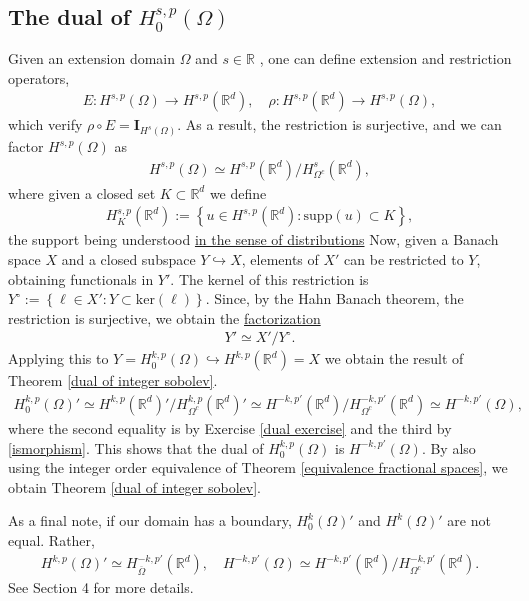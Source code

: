 \documentclass[
    a4paper,
    DIV=14,
    abstract=true,
    numbers=noenddot
]
{scrartcl}
\theoremstyle{definition}
\newcommand{\set}[1]{\left\{#1\right\}}
\newcommand{\Id}{\bm{I}}\renewcommand{\ker}{\bm{ker}}\newcommand{\supp}[1]{\bm{supp}(#1)}\renewcommand{\tr}[1]{\mathrm{tr}\left(#1\right)}
\newcommand{\rm}[1]{\mathrm{#1}}
\newcommand{\R}{\mathbb{R}}
\begin{document}
\subsection{The dual of $H^{s,p}_0(\Omega)$}
Given an extension domain $\Omega $ and $s \in \R$ , one can define extension and restriction operators,
\begin{align*}
    E:H^{s,p}(\Omega ) \to H^{s,p}(\R^d), \quad \rho: H^{s,p}(\R^d) \to H^{s,p}(\Omega ),
\end{align*}
which verify $\rho \circ E = \Id_{H^s(\Omega )}$. As a result, the restriction is surjective, and we can factor $H^{s,p}(\Omega )$ as
\begin{align}\label{ismorphism}
    H^{s,p}(\Omega )\simeq H^{s,p}(\R^d)\slash H^s_{\Omega^c}(\R^d ),
\end{align}
where given a closed set $K \subset \R^d$ we define
\begin{align*}
    H^{s,p}_K(\R^d):= \set{u \in H^{s,p}(\R^d): \rm{supp}(u) \subset K},
\end{align*}
the support being understood \href{https://nowheredifferentiable.com/2023-07-12-PDEs-3-Sobolev_spaces/#:~:text=Support%20of%20a%20distribution}{in the sense of distributions}
Now, given a Banach space $X$ and a closed subspace $Y \hookrightarrow X$, elements of $X'$ can be restricted to $Y$, obtaining functionals in $Y'$. The kernel of this restriction is $Y^\circ:=\set{\ell \in X': Y \subset \rm{ker}(\ell)}$. Since, by the Hahn Banach theorem, the restriction is surjective, we obtain the \href{https://math.la.asu.edu/~quigg/teach/courses/578/2008/notes/adjoints.pdf}{factorization}
\begin{align}\label{dual isomormphism}
    Y' \simeq X'\slash Y^\circ.
\end{align}
Applying this to $Y= H^{k,p}_0(\Omega )\hookrightarrow H^{k,p}(\R^d) =X$ we obtain the result of Theorem \ref{dual of integer sobolev}.
\begin{align*}
    H^{k,p}_0(\Omega )' \simeq H^{k,p}(\R^d)'\slash H^{k,p}_{\Omega^c}(\R^d)'\simeq H^{-k,p'}(\R^d)\slash H^{-k,p'}_{\Omega^c}(\R^d )\simeq H^{-k,p'}(\Omega ),
\end{align*}
where the second equality is by Exercise \ref{dual exercise} and the third by \eqref{ismorphism}.
This shows that the dual of $H^{k,p}_0(\Omega )$ is $H^{-k,p'}(\Omega )$. By also using the integer order equivalence of Theorem \ref{equivalence fractional spaces}, we obtain  Theorem \ref{dual of integer sobolev}.

As a final note, if our domain has a boundary, $H_0^k(\Omega )'$ and $H^k(\Omega )'$ are not equal. Rather,
\begin{align*}
    H^{k,p}(\Omega )'\simeq H_{\overline{\Omega } }^{-k,p'}(\R^d), \quad H^{-k,p'}(\Omega ) \simeq H^{-k,p'}(\R^d)\slash H^{-k,p'}_{\Omega ^c }(\R^d).
\end{align*}
See \cite{taylor2013partial} Section 4 for more details.
\end{document}
